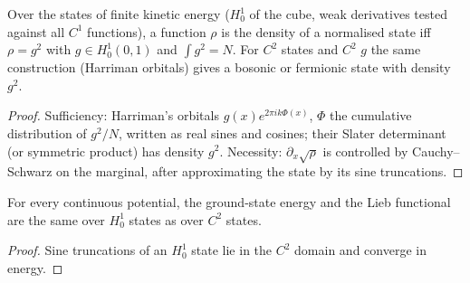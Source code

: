 \begin{theorem}[$N$-representability]
  \label{thm:line_nrep}
  \leanok
  Over the states of finite kinetic energy ($H^1_0$ of the cube, weak derivatives tested against all $C^1$
  functions), a function $\rho$ is the density of a normalised state iff $\rho=g^2$ with $g\in H^1_0(0,1)$ and
  $\int g^2=N$. For $C^2$ states and $C^2$ $g$ the same construction (Harriman orbitals) gives a bosonic or
  fermionic state with density $g^2$.
\end{theorem}
\begin{proof}
  \leanok
  Sufficiency: Harriman's orbitals $g(x)e^{2\pi ik\Phi(x)}$, $\Phi$ the cumulative distribution of $g^2/N$, written
  as real sines and cosines; their Slater determinant (or symmetric product) has density $g^2$. Necessity:
  $\partial_x\sqrt\rho$ is controlled by Cauchy--Schwarz on the marginal, after approximating the state by its
  sine truncations.
\end{proof}

\begin{theorem}
  \label{thm:line_weak_hk}
  \leanok
  For every continuous potential, the ground-state energy and the Lieb functional are the same over $H^1_0$ states as
  over $C^2$ states.
\end{theorem}
\begin{proof}
  \leanok
  Sine truncations of an $H^1_0$ state lie in the $C^2$ domain and converge in energy.
\end{proof}

